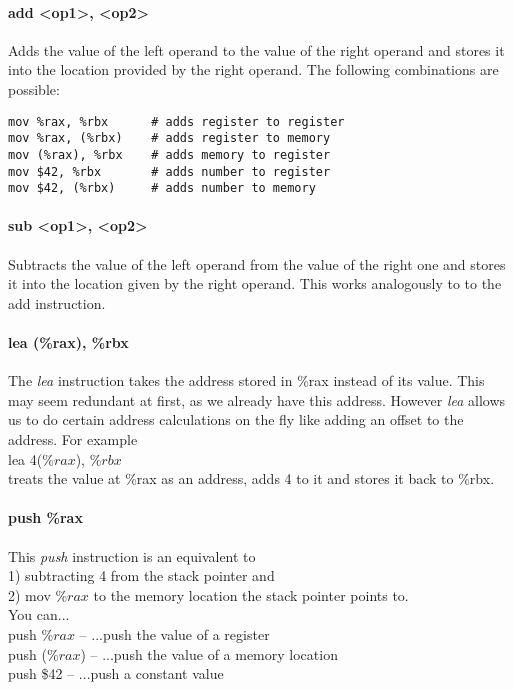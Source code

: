 \documentclass{scrreprt}
\begin{document}
\paragraph{add <op1>, <op2>}
Adds the value of the left operand to the value of the right operand and stores it into the location provided by the right operand. The following combinations are possible: \\
\begin{lstlisting}
mov %rax, %rbx 		# adds register to register
mov %rax, (%rbx) 	# adds register to memory
mov (%rax), %rbx 	# adds memory to register
mov $42, %rbx 		# adds number to register
mov $42, (%rbx) 	# adds number to memory
\end{lstlisting}

\paragraph{sub <op1>, <op2>}
Subtracts the value of the left operand from the value of the right one and stores it into the location given by the right operand. This works analogously to to the add instruction.

\paragraph{lea (\%rax), \%rbx}
The \textit{lea} instruction takes the address stored in \%rax instead of its value. This may seem redundant at first, as we already have this address. However \textit{lea} allows us to do certain address calculations on the fly like adding an offset to the address. For example \\
lea 4(\%$rax$), \%$rbx$ \\
treats the value at \%rax as an address, adds 4 to it and stores it back to \%rbx.

\paragraph{push \%rax}
This \textit{push} instruction is an equivalent to \\
1) subtracting 4 from the stack pointer and \\
2) mov \%$rax$ to the memory location the stack pointer points to. \\
You can... \\
push \%$rax$ -- ...push the value of a register  \\
push (\%$rax$) -- ...push the value of a memory location  \\
push \$42 -- ...push a constant value  \\
\end{document}
